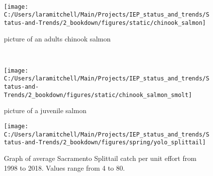 \documentclass[
]{book}
\begin{document}
\begin{panel-grid}
\begin{columns-nocenter}
\begin{column40}
~

\end{column40}

\begin{column800}

\begin{figure}

{\centering \texttt{[image: C:/Users/laramitchell/Main/Projects/IEP\_status\_and\_trends/Status-and-Trends/2\_bookdown/figures/static/chinook\_salmon]} 

}

\caption{picture of an adults chinook salmon}\label{fig:unnamed-chunk-33}
\end{figure}

\end{column800}

\begin{column40}

~

\end{column40}

\begin{column800}

\begin{figure}

{\centering \texttt{[image: C:/Users/laramitchell/Main/Projects/IEP\_status\_and\_trends/Status-and-Trends/2\_bookdown/figures/static/chinook\_salmon\_smolt]} 

}

\caption{picture of a juvenile salmon}\label{fig:unnamed-chunk-34}
\end{figure}

\end{column800}

\end{columns-nocenter}

\begin{columns-nocenter}

\begin{column800}

\begin{expand}

\begin{figure}
\texttt{[image: C:/Users/laramitchell/Main/Projects/IEP\_status\_and\_trends/Status-and-Trends/2\_bookdown/figures/spring/yolo\_splittail]} \caption{Graph of average Sacramento Splittail catch per unit effort from 1998 to 2018. Values range from 4 to 80.}\label{fig:unnamed-chunk-35}
\end{figure}


\end{expand}
\end{column800}
\end{columns-nocenter}
\end{panel-grid}
\end{document}

